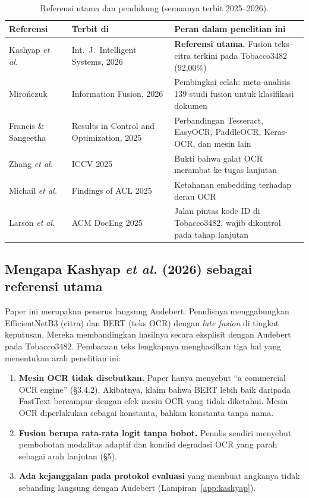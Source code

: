 \documentclass[11pt,a4paper]{article}
\begin{document}
\begin{table}[H]
\centering\small
\caption{Referensi utama dan pendukung (semuanya terbit 2025--2026).}
\label{tab:ref}
\begin{tabularx}{\textwidth}{@{}p{3.6cm} p{3.1cm} L@{}}
\toprule
Referensi & Terbit di & Peran dalam penelitian ini \\
\midrule
Kashyap \textit{et al.}~\cite{kashyap2026} & Int.\ J.\ Intelligent Systems, 2026 &
\textbf{Referensi utama.} Fusion teks--citra terkini pada Tobacco3482 (92,00\%) \\
Miro\'nczuk~\cite{mironczuk2026} & Information Fusion, 2026 &
Pembingkai celah: meta-analisis 139 studi fusion untuk klasifikasi dokumen \\
Francis \& Sangeetha~\cite{francis2025} & Results in Control and Optimization, 2025 &
Perbandingan Tesseract, EasyOCR, PaddleOCR, Keras-OCR, dan mesin lain \\
Zhang \textit{et al.}~\cite{zhang2025} & ICCV 2025 &
Bukti bahwa galat OCR merambat ke tugas lanjutan \\
Michail \textit{et al.}~\cite{michail2025} & Findings of ACL 2025 &
Ketahanan embedding terhadap derau OCR \\
Larson \textit{et al.}~\cite{larson2025} & ACM DocEng 2025 &
Jalan pintas kode ID di Tobacco3482, wajib dikontrol pada tahap lanjutan \\
\bottomrule
\end{tabularx}
\end{table}

\subsection{Mengapa Kashyap \textit{et al.} (2026) sebagai referensi utama}

Paper ini merupakan penerus langsung Audebert. Penulisnya menggabungkan EfficientNetB3
(citra) dan BERT (teks OCR) dengan \textit{late fusion} di tingkat keputusan. Mereka
membandingkan hasilnya secara eksplisit dengan Audebert pada Tobacco3482. Pembacaan teks
lengkapnya menghasilkan tiga hal yang menentukan arah penelitian ini:

\begin{enumerate}
  \item \textbf{Mesin OCR tidak disebutkan.} Paper hanya menyebut ``a commercial OCR
  engine'' (§3.4.2). Akibatnya, klaim bahwa BERT lebih baik daripada FastText
  bercampur dengan efek mesin OCR yang tidak diketahui. Mesin OCR diperlakukan sebagai
  konstanta, bahkan konstanta tanpa nama.
  \item \textbf{Fusion berupa rata-rata logit tanpa bobot.} Penulis sendiri menyebut
  pembobotan modalitas adaptif dan kondisi degradasi OCR yang parah sebagai arah
  lanjutan (§5).
  \item \textbf{Ada kejanggalan pada protokol evaluasi} yang membuat angkanya tidak
  sebanding langsung dengan Audebert (Lampiran~\ref{app:kashyap}).
\end{enumerate}
\end{document}
